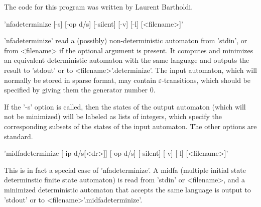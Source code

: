 The code for this program was written by Laurent Bartholdi.

'nfadeterminize [-s] [-op d/s] [-silent] [-v] [-l] [<filename>]'

'nfadeterminize' read a (possibly) non-deterministic automaton from
'stdin', or from <filename> if the optional argument is present.
It computes and minimizes an equivalent deterministic
automaton with the same language and outputs the result to 'stdout'
or to <filename>'.determinize'. The input automaton, which will
normally be stored in sparse format, may contain $\varepsilon$-transitions,
which should be specified by giving them the generator number 0.

If the '-s' option is called, then the states of the output automaton
(which will not be minimized) will be labeled as lists of integers, which
specify the corresponding subsets of the states of the input automaton.
The other options are standard.


'midfadeterminize [-ip d/s[<dr>]] [-op d/s] [-silent] [-v] [-l] [<filename>]'

This is in fact a special case of 'nfadeterminize'.
A midfa (multiple initial state determinstic finite state automaton) is read
from 'stdin' or <filename>, and a minimized deterministic automaton that
accepts the same language is output to 'stdout' or to
<filename>'.midfadeterminize'.
